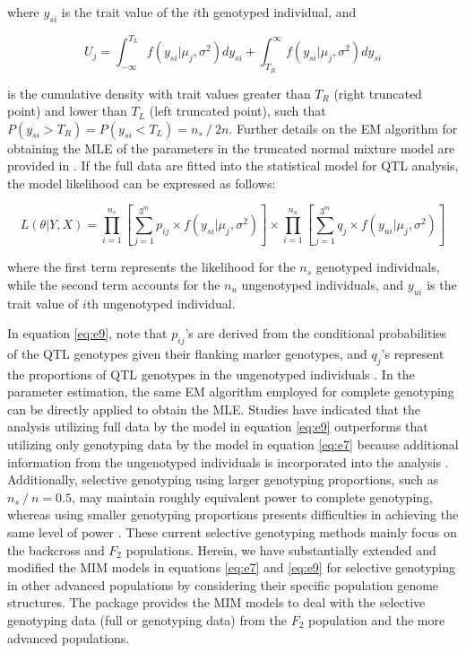 \noindent where $y_{si}$ is the trait value of the $i$th genotyped individual, and

\begin{equation} 
	U_{j}=\int_{-\infty }^{T_{L}}f\left(y_{si}|\mu_{j},\sigma^{2}\right)dy_{si}+\int_{T_{R}}^{\infty}f\left(y_{si}|\mu_{j},\sigma^{2}\right)dy_{si} \label{eq:e8}
\end{equation} 

\noindent is the cumulative density with trait values greater than $T_{R}$ (right truncated point) and lower than $T_{L}$ (left truncated point), such that $P\left(y_{si}>T_{R}\right)=P\left(y_{si}<T_{L}\right)=n_s⁄2n$. Further details on the EM algorithm for obtaining the MLE of the parameters in the truncated normal mixture model are provided in \citet{Lee-2014}. If the full data are fitted into the statistical model for QTL analysis, the model likelihood can be expressed as follows: 

\begin{equation}
	L\left(\theta|Y,X\right)=\prod_{i=1}^{n_{s}}\left[\sum_{j=1}^{3^{m}}p_{ij}\times f\left(y_{si}|\mu_{j},\sigma^{2}\right)\right]\times\prod_{i=1}^{n_{u}}\left[\sum_{j=1}^{3^{m}}q_{j}\times f\left(y_{ui}|\mu_{j},\sigma^{2}\right)\right] \label{eq:e9}
\end{equation} 

\noindent where the first term represents the likelihood for the $n_{s}$ genotyped individuals, while the second term accounts for the $n_{u}$ ungenotyped individuals, and $y_{ui}$ is the trait value of $i$th ungenotyped individual.

In equation \ref{eq:e9}, note that $p_{ij}$’s are derived from the conditional probabilities of the QTL genotypes given their flanking marker genotypes, and $q_{j}$’s represent the proportions of QTL genotypes in the ungenotyped individuals \citep{Lee-2014}. In the parameter estimation, the same EM algorithm employed for complete genotyping \citep{Kao-1997} can be directly applied to obtain the MLE. Studies have indicated that the analysis utilizing full data by the model in equation \ref{eq:e9} outperforms that utilizing only genotyping data by the model in equation \ref{eq:e7} because additional information from the ungenotyped individuals is incorporated into the analysis \citep{Xu-2000, Lee-2014}. Additionally, selective genotyping using larger genotyping proportions, such as $n_{s}⁄n=0.5$, may maintain roughly equivalent power to complete genotyping, whereas using smaller genotyping proportions presents difficulties in achieving the same level of power \citep{Lee-2014}. These current selective genotyping methods mainly focus on the backcross and $F_2$ populations. Herein, we have substantially extended and modified the MIM models in equations \ref{eq:e7} and \ref{eq:e9} for selective genotyping in other advanced populations by considering their specific population genome structures. The  package provides the MIM models to deal with the selective genotyping data (full or genotyping data) from the $F_2$ population and the more advanced populations. 

